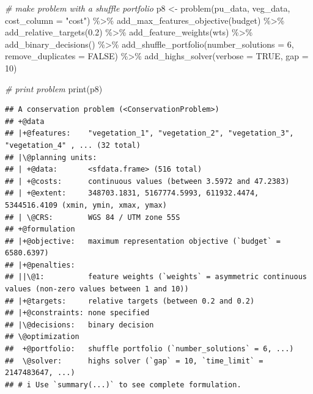 \documentclass[
  12pt,
]{book}
\newenvironment{Shaded}{\begin{snugshade}}{\end{snugshade}}
\newcommand{\AttributeTok}[1]{\textcolor[rgb]{0.77,0.63,0.00}{#1}}
\newcommand{\CommentTok}[1]{\textcolor[rgb]{0.56,0.35,0.01}{\textit{#1}}}
\newcommand{\ConstantTok}[1]{\textcolor[rgb]{0.00,0.00,0.00}{#1}}
\newcommand{\DecValTok}[1]{\textcolor[rgb]{0.00,0.00,0.81}{#1}}
\newcommand{\FloatTok}[1]{\textcolor[rgb]{0.00,0.00,0.81}{#1}}
\newcommand{\FunctionTok}[1]{\textcolor[rgb]{0.00,0.00,0.00}{#1}}
\newcommand{\NormalTok}[1]{#1}
\newcommand{\OtherTok}[1]{\textcolor[rgb]{0.56,0.35,0.01}{#1}}
\newcommand{\SpecialCharTok}[1]{\textcolor[rgb]{0.00,0.00,0.00}{#1}}
\newcommand{\StringTok}[1]{\textcolor[rgb]{0.31,0.60,0.02}{#1}}
\begin{document}
\begin{Shaded}
\begin{Highlighting}[]
\CommentTok{\# make problem with a shuffle portfolio}
\NormalTok{p8 }\OtherTok{\textless{}{-}} \FunctionTok{problem}\NormalTok{(pu\_data, veg\_data, }\AttributeTok{cost\_column =} \StringTok{"cost"}\NormalTok{) }\SpecialCharTok{\%\textgreater{}\%}
      \FunctionTok{add\_max\_features\_objective}\NormalTok{(budget) }\SpecialCharTok{\%\textgreater{}\%}
      \FunctionTok{add\_relative\_targets}\NormalTok{(}\FloatTok{0.2}\NormalTok{) }\SpecialCharTok{\%\textgreater{}\%}
      \FunctionTok{add\_feature\_weights}\NormalTok{(wts) }\SpecialCharTok{\%\textgreater{}\%}
      \FunctionTok{add\_binary\_decisions}\NormalTok{() }\SpecialCharTok{\%\textgreater{}\%}
      \FunctionTok{add\_shuffle\_portfolio}\NormalTok{(}\AttributeTok{number\_solutions =} \DecValTok{6}\NormalTok{,}
                            \AttributeTok{remove\_duplicates =} \ConstantTok{FALSE}\NormalTok{) }\SpecialCharTok{\%\textgreater{}\%}
      \FunctionTok{add\_highs\_solver}\NormalTok{(}\AttributeTok{verbose =} \ConstantTok{TRUE}\NormalTok{, }\AttributeTok{gap =} \DecValTok{10}\NormalTok{)}
\end{Highlighting}
\end{Shaded}

\clearpage

\begin{Shaded}
\begin{Highlighting}[]
\CommentTok{\# print problem}
\FunctionTok{print}\NormalTok{(p8)}
\end{Highlighting}
\end{Shaded}

\begin{verbatim}
## A conservation problem (<ConservationProblem>)
## +@data
## |+@features:    "vegetation_1", "vegetation_2", "vegetation_3", "vegetation_4" , ... (32 total)
## |\@planning units:
## | +@data:       <sfdata.frame> (516 total)
## | +@costs:      continuous values (between 3.5972 and 47.2383)
## | +@extent:     348703.1831, 5167774.5993, 611932.4474, 5344516.4109 (xmin, ymin, xmax, ymax)
## | \@CRS:        WGS 84 / UTM zone 55S
## +@formulation
## |+@objective:   maximum representation objective (`budget` = 6580.6397)
## |+@penalties:
## ||\@1:          feature weights (`weights` = asymmetric continuous values (non-zero values between 1 and 10))
## |+@targets:     relative targets (between 0.2 and 0.2)
## |+@constraints: none specified
## |\@decisions:   binary decision
## \@optimization
##  +@portfolio:   shuffle portfolio (`number_solutions` = 6, ...)
##  \@solver:      highs solver (`gap` = 10, `time_limit` = 2147483647, ...)
## # i Use `summary(...)` to see complete formulation.
\end{verbatim}
\end{document}
